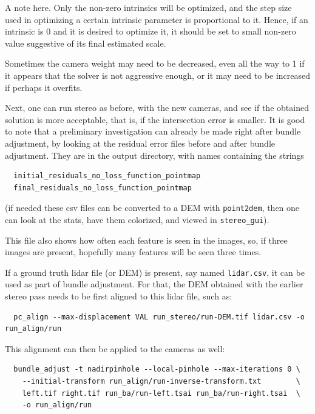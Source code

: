 A note here. Only the non-zero intrinsics will be optimized, and the step size
used in optimizing a certain intrinsic parameter is proportional to it. Hence,
if an intrinsic is 0 and it is desired to optimize it, it should be set
to small non-zero value suggestive of its final estimated scale. 

Sometimes the camera weight may need to be decreased, even all the way
to 1 if it appears that the solver is not aggressive enough, or it may
need to be increased if perhaps it overfits.

Next, one can run stereo as before, with the new cameras, and see if the obtained
solution is more acceptable, that is, if the intersection error is smaller. It is good to
note that a preliminary investigation can already be made right after bundle adjustment,
by looking at the residual error files before and after bundle adjustment. They are in 
the output directory, with names containing the strings
\begin{verbatim}
  initial_residuals_no_loss_function_pointmap
  final_residuals_no_loss_function_pointmap
\end{verbatim}

(if needed these csv files can be converted to a DEM with
\texttt{point2dem}, then one can look at the stats, have them colorized,
and viewed in \texttt{stereo\_gui}).

This file also shows how often each feature is seen in the images, so, if three
images are present, hopefully many features will be seen three times. 

If a ground truth lidar file (or DEM) is present, say named \texttt{lidar.csv}, it can be used
as part of bundle adjustment. For that, the DEM obtained with the earlier
stereo pass needs to be first aligned to this lidar file, such as:

\begin{verbatim}
  pc_align --max-displacement VAL run_stereo/run-DEM.tif lidar.csv -o run_align/run 
\end{verbatim}

This alignment can then be applied to the cameras as well:

\begin{verbatim}
  bundle_adjust -t nadirpinhole --local-pinhole --max-iterations 0 \
    --initial-transform run_align/run-inverse-transform.txt        \
    left.tif right.tif run_ba/run-left.tsai run_ba/run-right.tsai  \
    -o run_align/run
\end{verbatim}

